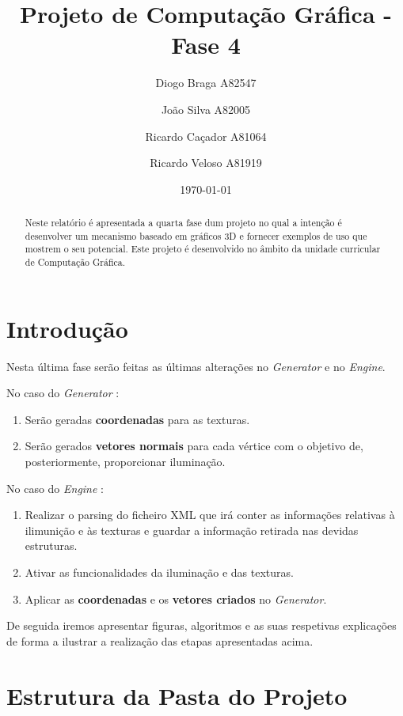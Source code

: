\documentclass[a4paper]{article}
\title{Projeto de Computação Gráfica - Fase 4}
\author{Diogo Braga A82547 \and João Silva A82005 \and Ricardo Caçador A81064
\and Ricardo Veloso A81919}
\date{\today}
\begin{document}
\maketitle

\begin{abstract}
Neste relatório é apresentada a quarta fase dum projeto no qual a intenção é desenvolver um mecanismo baseado em gráficos 3D e fornecer exemplos de uso que mostrem o seu potencial. Este projeto é desenvolvido no âmbito da unidade curricular de Computação Gráfica.
\end{abstract}

\newpage

\tableofcontents


\newpage

\section{Introdução}
\label{sec:intro}

Nesta última fase serão feitas as últimas alterações no \textit{Generator} e no \textit{Engine}.


No caso do \textit{Generator} :

\begin{enumerate}
	\item Serão geradas \textbf{coordenadas} para as texturas.
	\item Serão gerados \textbf{vetores normais} para cada vértice com o objetivo de, posteriormente, proporcionar iluminação.
\end{enumerate}

No caso do \textit{Engine} :

\begin{enumerate}
	\item Realizar o parsing do ficheiro XML que irá conter as informações relativas à ilimunição e às texturas e guardar a informação retirada nas devidas estruturas.
	\item Ativar as funcionalidades da iluminação e das texturas.
	\item Aplicar as \textbf{coordenadas} e os \textbf{vetores criados} no \textit{Generator}.
\end{enumerate}

De seguida iremos apresentar figuras, algoritmos e as suas respetivas explicações de forma a ilustrar a realização das etapas apresentadas acima.

\section{Estrutura da Pasta do Projeto}
\label{sec:estrutura}
\end{document}

